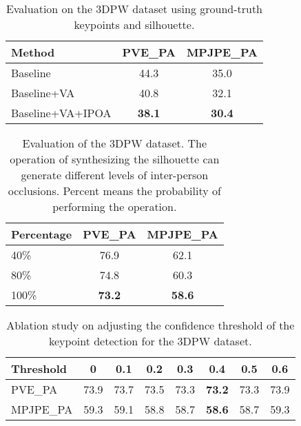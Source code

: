\documentclass[journal]{IEEEtran}
\begin{document}
\begin{table}[!htbp]
\vspace{-0.2cm}
\caption{ Evaluation on the 3DPW dataset using ground-truth keypoints and silhouette.}
\begin{center}
\begin{tabular}{lcc}
\hline
Method                          & PVE\_PA       & MPJPE\_PA     \\ \hline
Baseline                        & 44.3          & 35.0          \\
Baseline+VA                & 40.8          & 32.1          \\
Baseline+VA+IPOA & \textbf{38.1} & \textbf{30.4} \\ \hline
\end{tabular}
\label{tab:groundtruth}
\end{center}
\end{table}
\vspace{-0.2cm}


\begin{table}[!htbp]
\caption{Evaluation of the 3DPW dataset. The operation of synthesizing the silhouette can generate different levels of inter-person occlusions. Percent means the probability of performing the operation.}
\begin{center}
\begin{tabular}{@{}lcc@{}}
\toprule
Percentage & PVE\_PA & MPJPE\_PA \\ \midrule
40\%       & 76.9    & 62.1      \\
80\%       & 74.8    & 60.3      \\
100\%      & \textbf{73.2}    & \textbf{58.6}      \\ \bottomrule
\end{tabular}
\label{percentage}
\end{center}
\end{table}




\begin{table}[!htbp]
\caption{Ablation study on adjusting the confidence threshold of the keypoint detection for the 3DPW dataset.}
\begin{center}
\begin{tabular}{lccccccc}
\hline
Threshold & 0    & 0.1  & 0.2  & 0.3  & 0.4  & 0.5  & 0.6  \\ \hline
PVE\_PA   & 73.9 & 73.7 & 73.5 & 73.3 & \textbf{73.2} & 73.3 & 73.9 \\ \hline
MPJPE\_PA & 59.3 & 59.1 & 58.8 & 58.7 & \textbf{58.6} & 58.7 & 59.3 \\ \hline
\end{tabular}
\label{confidence}
\end{center}
\end{table}
\vspace{-0.2cm}
\end{document}
